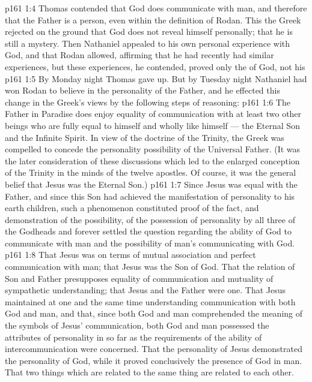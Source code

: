 \vs p161 1:4 Thomas contended that God does communicate with man, and therefore that the Father is a person, even within the definition of Rodan. This the Greek rejected on the ground that God does not reveal himself personally; that he is still a mystery. Then Nathaniel appealed to his own personal experience with God, and that Rodan allowed, affirming that he had recently had similar experiences, but these experiences, he contended, proved only the  of God, not his 
\vs p161 1:5 By Monday night Thomas gave up. But by Tuesday night Nathaniel had won Rodan to believe in the personality of the Father, and he effected this change in the Greek’s views by the following steps of reasoning:
\vs p161 1:6 \bibnobreakspace The Father in Paradise does enjoy equality of communication with at least two other beings who are fully equal to himself and wholly like himself --- the Eternal Son and the Infinite Spirit. In view of the doctrine of the Trinity, the Greek was compelled to concede the personality possibility of the Universal Father. (It was the later consideration of these discussions which led to the enlarged conception of the Trinity in the minds of the twelve apostles. Of course, it was the general belief that Jesus was the Eternal Son.)
\vs p161 1:7 \pc {}\bibnobreakspace Since Jesus was equal with the Father, and since this Son had achieved the manifestation of personality to his earth children, such a phenomenon constituted proof of the fact, and demonstration of the possibility, of the possession of personality by all three of the Godheads and forever settled the question regarding the ability of God to communicate with man and the possibility of man’s communicating with God.
\vs p161 1:8 \pc {}\bibnobreakspace That Jesus was on terms of mutual association and perfect communication with man; that Jesus was the Son of God. That the relation of Son and Father presupposes equality of communication and mutuality of sympathetic understanding; that Jesus and the Father were one. That Jesus maintained at one and the same time understanding communication with both God and man, and that, since both God and man comprehended the meaning of the symbols of Jesus’ communication, both God and man possessed the attributes of personality in so far as the requirements of the ability of intercommunication were concerned. That the personality of Jesus demonstrated the personality of God, while it proved conclusively the presence of God in man. That two things which are related to the same thing are related to each other.
